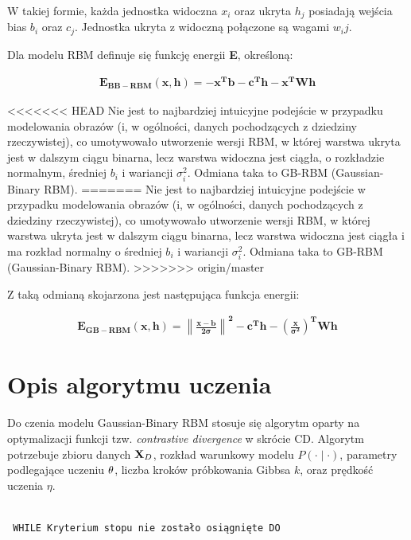 \documentclass[a4paper,10pt]{report}
\begin{document}
W takiej formie, każda jednostka widoczna $x_i$ oraz ukryta $h_j$ posiadają wejścia bias $b_i$ oraz
$c_j$.
Jednostka ukryta z widoczną połączone są wagami $w_ij$.

Dla modelu RBM definuje się funkcję energii \textbf{E}, określoną:

\begin{align}
	\mathbf{E_{BB-RBM}(x,h) = -x^Tb - c^Th - x^TWh}
\end{align}

<<<<<<< HEAD
Nie jest to najbardziej intuicyjne podejście w przypadku modelowania obrazów (i, w ogólności, danych pochodzących z dziedziny rzeczywistej), co umotywowało utworzenie wersji RBM, w której warstwa ukryta jest w dalszym ciągu binarna, lecz warstwa widoczna jest ciągła, o rozkładzie normalnym, średniej $b_i$ i wariancji $\sigma^2_i$. Odmiana taka to GB-RBM (Gaussian-Binary RBM).
=======
Nie jest to najbardziej intuicyjne podejście w przypadku modelowania obrazów (i, w ogólności, danych
pochodzących z dziedziny rzeczywistej), co umotywowało utworzenie wersji RBM, w której warstwa ukryta
jest w dalszym ciągu binarna, lecz warstwa widoczna jest ciągła i ma rozkład normalny o średniej $b_i$ i
wariancji $\sigma^2_i$. Odmiana taka to GB-RBM (Gaussian-Binary RBM).
>>>>>>> origin/master

Z taką odmianą skojarzona jest następująca funkcja energii:

\begin{align}
	\mathbf{E_{GB-RBM}(x,h) = \left\| \frac{x - b}{2 \sigma} \right\| ^2 - c^Th - \left( \frac{x}{\sigma^2} \right) ^TWh}
\end{align}

\section{Opis algorytmu uczenia}

Do czenia modelu Gaussian-Binary RBM stosuje się algorytm oparty na optymalizacji funkcji tzw.
\textit{contrastive divergence} w skrócie CD. Algorytm potrzebuje zbioru danych ${\bf X}_D$, rozkład
warunkowy modelu $P(\cdot\mid\cdot)$, parametry podlegające uczeniu ${\bf \theta}$, liczba kroków
próbkowania Gibbsa $k$, oraz prędkość uczenia $\eta$. 

\begin{verbatim}

 WHILE Kryterium stopu nie zostało osiągnięte DO
   
\end{verbatim}
\end{document}

